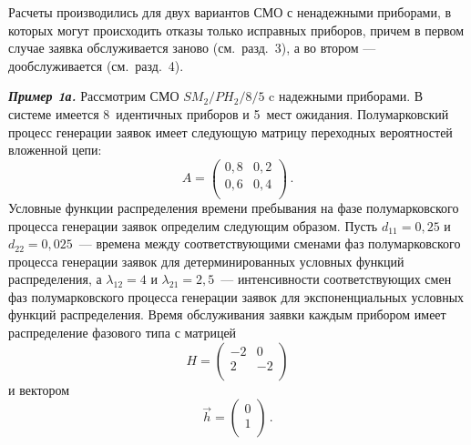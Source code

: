 \begin{multicols}{2}
Расчеты производились для двух вариантов СМО с ненадежными приборами,
в которых могут происходить отказы только исправных приборов,
причем в первом случае заявка обслуживается заново (см.\ разд.~3),
а во втором --- дообслуживается (см.\ разд.~4).

{\bfseries\textit{Пример 1а.}}
Рассмотрим СМО $SM_2/PH_2/8/5$ c надежными приборами.
В системе имеется 8~идентичных приборов и 5~мест ожидания.
Полумарковский процесс генерации заявок имеет следующую матрицу
переходных вероятностей вложенной цепи:
$$
A=
\begin{pmatrix}
0{,}8 & 0{,}2\\
0{,}6 & 0{,}4\\
\end{pmatrix}\,.
$$
Условные функции распределения времени пребывания на фазе полумарковского
процесса генерации заявок определим следующим образом.
Пусть $d_{11}=0{,}25$ и $d_{22}=0{,}025$~--- времена между соответствующими
сменами фаз полумарковского процесса генерации заявок
для детерминированных условных функций распределения,
а $\lambda_{12}=4$ и $\lambda_{21}=2{,}5$~--- интенсивности
соответствующих смен фаз полумарковского процесса
генерации заявок для экспоненциальных условных функций распределения.
Время обслуживания заявки каждым прибором имеет распределение
фазового типа с мат\-ри\-цей
$$
H=
\begin{pmatrix}
-2 & 0\\
2 & -2\\
\end{pmatrix}
$$
и вектором
$$
\vec h =
\begin{pmatrix}
0\\
1\\
\end{pmatrix}\,.
$$




\end{multicols}
